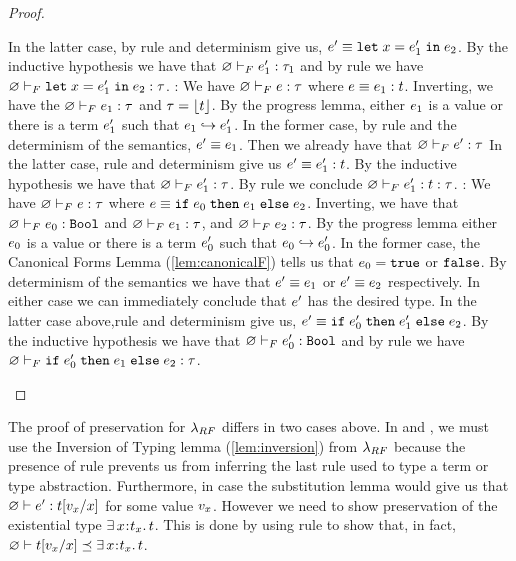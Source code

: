 \begin{proof}
\begin{itemize}
  In the latter case, by rule \eLet and determinism give us, 
  $\sexpr' \equiv \eletin{x}{\sexpr'_1}{\sexpr_2}$.
  By the inductive hypothesis we have that 
  $\hasftype{\varnothing}{\sexpr'_1}{\sftype_1}$ and by rule \fLet 
  we have $\hasftype{\varnothing}{\eletin{x}{\sexpr'_1}{\sexpr_2}}{\sftype}$. 
  \pfcase{\fAnn}: We have 
  $\hasftype{\varnothing}{\sexpr}{\sftype}$ where
  $\sexpr \equiv \tyann{\sexpr_1}{\stype}$. Inverting,
  we have the $\hasftype{\varnothing}{\sexpr_1}{\sftype}$ and
  $\sftype = \forgetreft{\stype}$. 
  By the progress lemma, either $\sexpr_1$ is a value
  or there is a term $\sexpr'_1$ such that $\sexpr_1 \step \sexpr'_1$.
  In the former case, by rule \eAnnV and the determinism of the semantics, 
  $\sexpr' \equiv \sexpr_1$. Then we already have that
  $\hasftype{\varnothing}{\sexpr'}{\sftype}$
  In the latter case, rule \eAnn and determinism give us 
  $\sexpr' \equiv \tyann{\sexpr'_1}{\stype}$. By the inductive hypothesis
  we have that $\hasftype{\varnothing}{\sexpr'_1}{\sftype}$. By rule
  \fAnn we conclude $\hasftype{\varnothing}{\tyann{\sexpr'_1}{\stype}}{\sftype}$.
  \pfcase{\fIf}: We have 
  $\hasftype{\varnothing}{\sexpr}{\sftype}$ where
  $\sexpr \equiv \eif{\sexpr_0}{\sexpr_1}{\sexpr_2}$. Inverting,
  we have that 
  $\hasftype{\varnothing}{\sexpr_0}{\tbool}$
  and
  $\hasftype{\varnothing}{\sexpr_1}{\sftype}$,
  and
  $\hasftype{\varnothing}{\sexpr_2}{\sftype}$.
  By the progress lemma either $\sexpr_0$ is a value
  or there is a term $\sexpr'_0$ such that $\sexpr_0 \step \sexpr'_0$.
  In the former case, the Canonical Forms Lemma (\ref{lem:canonicalF})
  tells us that $\sexpr_0 = \ttrue$ or $\tfalse$.
  By determinism of the semantics we have that 
  $\sexpr' \equiv {\sexpr_1}$
  or $\sexpr' \equiv {\sexpr_2}$ respectively.
  In either case we can immediately conclude that $\sexpr'$
  has the desired type.
  In the latter case above,rule \eIf and determinism give us, 
  $\sexpr' \equiv \eif{\sexpr'_0}{\sexpr'_1}{\sexpr_2}$.
  By the inductive hypothesis we have that 
  $\hasftype{\varnothing}{\sexpr'_0}{\tbool}$ and by rule \fIf 
  we have 
  $\hasftype{\varnothing}{\eif{\sexpr'_0}{\sexpr_1}{\sexpr_2}}{\sftype}$. 
  \end{itemize}
\end{proof}
%
The proof of preservation for $\sysrf$ differs in two cases above. 
In \tApp and \tTApp, we must use the 
Inversion of Typing lemma (\ref{lem:inversion})
from $\sysrf$ because the presence of rule \tSub prevents us from 
inferring the last rule used to type a term or type abstraction.
%
Furthermore, in case \tApp the substitution lemma would give us that 
$\hastype{\varnothing}{\sexpr'}{\subst{\stype}{x}{\sval_x}}$ for 
some value $\sval_x$. However we need to show preservation of the
existential type $\existype{x}{\stype_x}{\stype}$. This is done by
using rule \sWitn to show that, in fact, 
$\isSubType{\varnothing}{\subst{\stype}{x}{\sval_x}}{\existype{x}{\stype_x}{\stype}}$.

